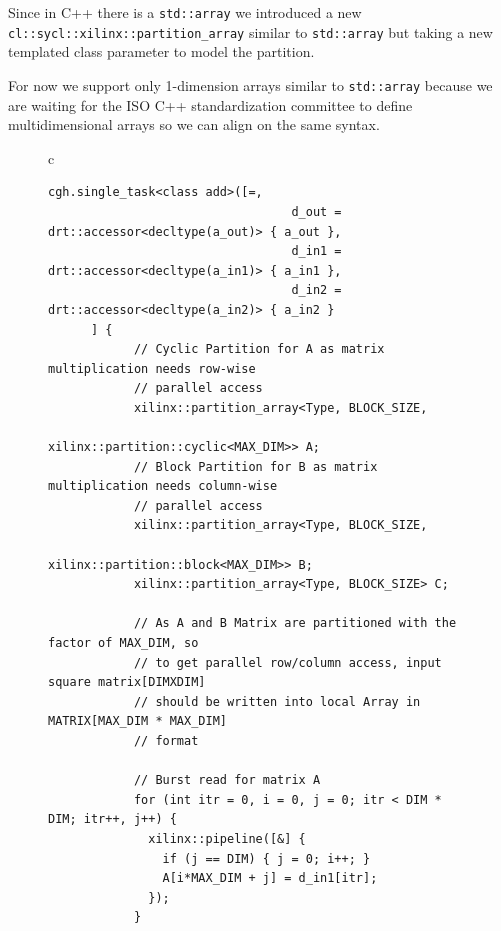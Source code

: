 \documentclass[sigplan, review, authordraft]{acmart}
\begin{document}
Since in C++ there is a \lstinline|std::array| we introduced a new
\lstinline|cl::sycl::xilinx::partition_array| similar to
\lstinline|std::array| but taking a new templated class parameter to
model the partition.

For now we support only 1-dimension arrays similar to
\lstinline|std::array| because we are waiting for the ISO C++
standardization committee to define multidimensional arrays
\cite{C++:P0xyzrv:md-span} so we can align on the same syntax.

\begin{figure}
  \begin{tabular}{c}
    \begin{lstlisting}[basicstyle=\scriptsize,name=PartitionCyclicblockTriSYCL]
      cgh.single_task<class add>([=,
                                  d_out = drt::accessor<decltype(a_out)> { a_out },
                                  d_in1 = drt::accessor<decltype(a_in1)> { a_in1 },
                                  d_in2 = drt::accessor<decltype(a_in2)> { a_in2 }
      ] {
            // Cyclic Partition for A as matrix multiplication needs row-wise
            // parallel access
            xilinx::partition_array<Type, BLOCK_SIZE,
                                    xilinx::partition::cyclic<MAX_DIM>> A;
            // Block Partition for B as matrix multiplication needs column-wise
            // parallel access
            xilinx::partition_array<Type, BLOCK_SIZE,
                                    xilinx::partition::block<MAX_DIM>> B;
            xilinx::partition_array<Type, BLOCK_SIZE> C;

            // As A and B Matrix are partitioned with the factor of MAX_DIM, so
            // to get parallel row/column access, input square matrix[DIMXDIM]
            // should be written into local Array in MATRIX[MAX_DIM * MAX_DIM]
            // format

            // Burst read for matrix A
            for (int itr = 0, i = 0, j = 0; itr < DIM * DIM; itr++, j++) {
              xilinx::pipeline([&] {
                if (j == DIM) { j = 0; i++; }
                A[i*MAX_DIM + j] = d_in1[itr];
              });
            }


\end{lstlisting}
\end{tabular}
\end{figure}
\end{document}
